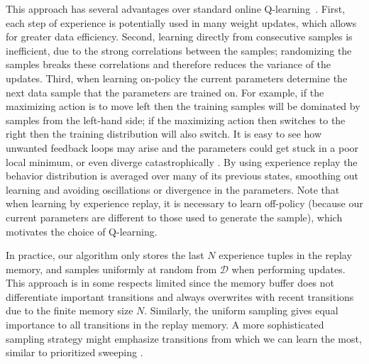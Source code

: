 This approach has several advantages over standard online Q-learning~\cite{sutton:book}. First, each step of experience is potentially used in many weight updates, which allows for greater data efficiency. Second, learning directly from consecutive samples is inefficient, due to the strong correlations between the samples; randomizing the samples breaks these correlations and therefore reduces the variance of the updates. Third, when learning on-policy the current parameters determine the next data sample that the parameters are trained on. For example, if the maximizing action is to move left then the training samples will be dominated by samples from the left-hand side; if the maximizing action then switches to the right then the training distribution will also switch. It is easy to see how unwanted feedback loops may arise and the parameters could get stuck in a poor local minimum, or even diverge catastrophically \cite{tsitsiklis:td-convergence}. By using experience replay the behavior distribution is averaged over many of its previous states, smoothing out learning and avoiding oscillations or divergence in the parameters. Note that when learning by experience replay, it is necessary to learn off-policy (because our current parameters are different to those used to generate the sample), which motivates the choice of Q-learning.

In practice, our algorithm only stores the last $N$ experience tuples in the replay memory, and samples uniformly at random from $\mathcal{D}$ when performing updates. This approach is in some respects limited since the memory buffer does not differentiate important transitions and always overwrites with recent transitions due to the finite memory size $N$. Similarly, the uniform sampling gives equal importance to all transitions in the replay memory. A more sophisticated sampling strategy might emphasize transitions from which we can learn the most, similar to prioritized sweeping \cite{moore:prioritized}.  %



